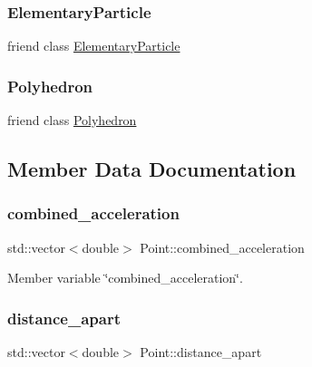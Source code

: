 \subsubsection{\texorpdfstring{Elementary\+Particle}{ElementaryParticle}}
{\footnotesize\ttfamily friend class \mbox{\hyperlink{classElementaryParticle}{Elementary\+Particle}}\hspace{0.3cm}{\ttfamily [friend]}}

\mbox{\label{classPoint_a28d1b9582890ca3e2b61dafdc1c3ba84}} 
\subsubsection{\texorpdfstring{Polyhedron}{Polyhedron}}
{\footnotesize\ttfamily friend class \mbox{\hyperlink{classPolyhedron}{Polyhedron}}\hspace{0.3cm}{\ttfamily [friend]}}



\subsection{Member Data Documentation}
\mbox{\label{classPoint_aa71ef0cdabcc5fbb4b3e6532b76b4027}} 
\subsubsection{\texorpdfstring{combined\+\_\+acceleration}{combined\_acceleration}}
{\footnotesize\ttfamily std\+::vector$<$double$>$ Point\+::combined\+\_\+acceleration\hspace{0.3cm}{\ttfamily [private]}}



Member variable \char`\"{}combined\+\_\+acceleration\char`\"{}. 

\mbox{\label{classPoint_adab2c73402406c954413b98a7f608154}} 
\subsubsection{\texorpdfstring{distance\+\_\+apart}{distance\_apart}}
{\footnotesize\ttfamily std\+::vector$<$double$>$ Point\+::distance\+\_\+apart\hspace{0.3cm}{\ttfamily [private]}}




